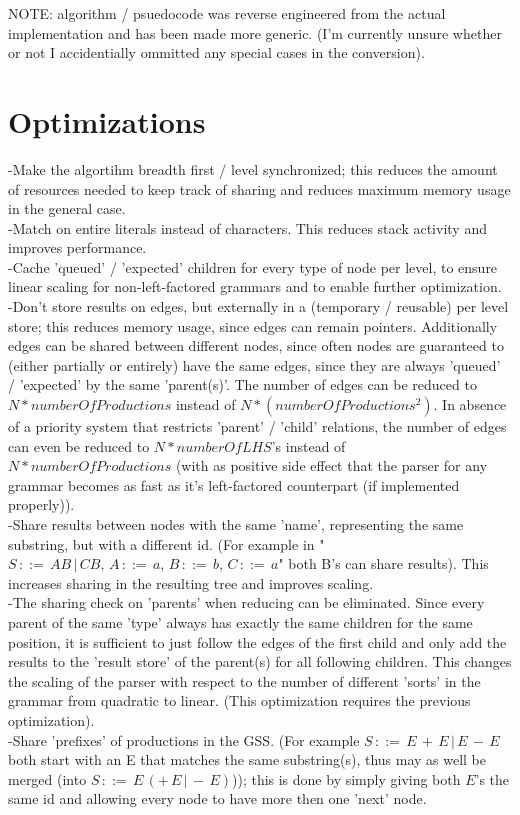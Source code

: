 \documentclass[a4paper,10pt]{article}
\begin{document}
NOTE: algorithm / psuedocode was reverse engineered from the actual implementation and has been made more generic. (I'm currently unsure whether or not I accidentially ommitted any special cases in the conversion).\\

\section{Optimizations}

-Make the algortihm breadth first / level synchronized; this reduces the amount of resources needed to keep track of sharing and reduces maximum memory usage in the general case.\\
-Match on entire literals instead of characters. This reduces stack activity and improves performance.\\
-Cache 'queued' / 'expected' children for every type of node per level, to ensure linear scaling for non-left-factored grammars and to enable further optimization.\\
-Don't store results on edges, but externally in a (temporary / reusable) per level store; this reduces memory usage, since edges can remain pointers. Additionally edges can be shared between different nodes, since often nodes are guaranteed to (either partially or entirely) have the same edges, since they are always 'queued' / 'expected' by the same 'parent(s)'. The number of edges can be reduced to $N * numberOfProductions$ instead of $N * (numberOfProductions^{2})$. In absence of a priority system that restricts 'parent' / 'child' relations, the number of edges can even be reduced to $N * numberOfLHS$'s instead of $N * numberOfProductions$ (with as positive side effect that the parser for any grammar becomes as fast as it's left-factored counterpart (if implemented properly)).\\
-Share results between nodes with the same 'name', representing the same substring, but with a different id. (For example in "$S\,::=\,AB\,|\,CB,\,A\,::=\,a,\,B\,::=\,b,\,C\,::=\,a$" both B's can share results). This increases sharing in the resulting tree and improves scaling.\\
-The sharing check on 'parents' when reducing can be eliminated. Since every parent of the same 'type' always has exactly the same children for the same position, it is sufficient to just follow the edges of the first child and only add the results to the 'result store' of the parent(s) for all following children. This changes the scaling of the parser with respect to the number of different 'sorts' in the grammar from quadratic to linear. (This optimization requires the previous optimization).\\
-Share 'prefixes' of productions in the GSS. (For example $S\,::=\,E\,+\,E\,|\,E\,-\,E$ both start with an E that matches the same substring(s), thus may as well be merged (into $S\,::=\,E\,(+\,E\,|\,-\,E)$)); this is done by simply giving both $E$'s the same id and allowing every node to have more then one 'next' node.\\
\end{document}
